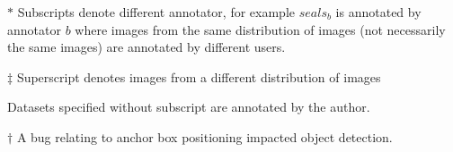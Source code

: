 \begin{threeparttable}[!h]
\begin{tabular}{lllll}
\bottomrule
\end{tabular}
\begin{tablenotes}
\small
\item $*$ Subscripts denote different annotator, for example $seals_b$ is annotated by annotator $b$ where images from the same distribution of images (not necessarily the same images) are annotated by different users.  
\item $\ddagger$ Superscript denotes images from a different distribution of images
\item Datasets specified without subscript are annotated by the author.
\item $\dagger$ A bug relating to anchor box positioning impacted object detection. 
\end{tablenotes}
\end{threeparttable}


